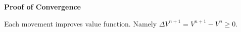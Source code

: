 \documentclass{beamer}
\begin{document}
\begin{frame}
{\bf Proof of Convergence}
\begin{Theorem}
Each movement improves value function. Namely $\Delta V^{n+1} = V^{n+1} - V^{n}\geq 0 $.
\end{Theorem}

\begin{columns}
\end{columns}
\end{frame}
\end{document}
